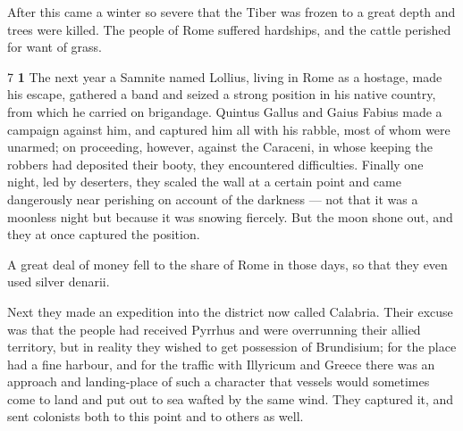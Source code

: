 After this came a winter so severe that the Tiber was frozen to a great depth and trees were killed. The people of Rome suffered hardships, and the cattle perished for want of grass.

7 \textbf{1} The next year a Samnite named Lollius, living in Rome as a hostage, made his escape, gathered a band and seized a strong position in his native country, from which he carried on brigandage. Quintus Gallus and Gaius Fabius made a campaign against him, and captured him all with his rabble, most of whom were unarmed; on proceeding, however, against the Caraceni, in whose keeping the robbers had deposited their booty, they encountered difficulties. Finally one night, led by deserters, they scaled the wall at a certain point and came dangerously near perishing on account of the darkness \texthebrew{—} not that it was a moonless night but because it was snowing fiercely. But the moon shone out, and they at once captured the position.

A great deal of money fell to the share of Rome in those days, so that they even used silver denarii.

Next they made an expedition into the district now called Calabria. Their excuse was that the people had received Pyrrhus and were overrunning their allied territory, but in reality they wished to get possession of Brundisium; for the place had a fine harbour, and for the traffic with Illyricum and Greece there was an approach and landing-place of such a character that vessels would sometimes come to land and put out to sea wafted by the same wind. They captured it, and sent colonists both to this point and to others as well.

